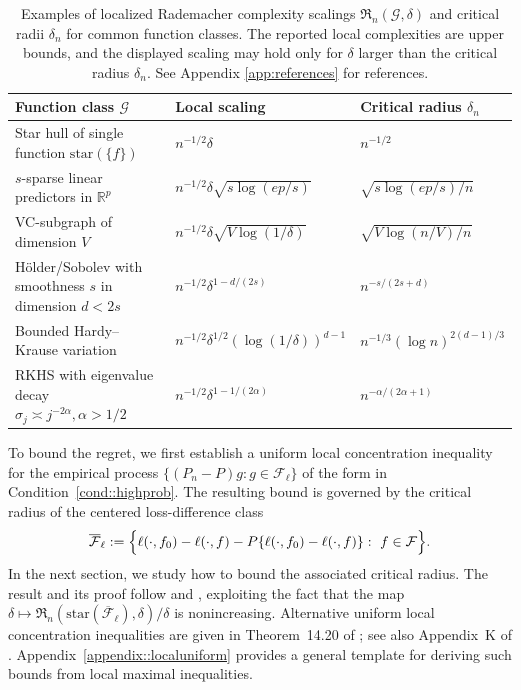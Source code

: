 \documentclass[11pt]{article}
\theoremstyle{plain}
\theoremstyle{definition} %
\begin{document}
\begin{table}[h]
\centering
\caption{Examples of localized Rademacher complexity scalings \(\mathfrak{R}_n(\mathcal{G},\delta)\) and critical radii \(\delta_n\) for common function classes. The reported local complexities are upper bounds, and the displayed scaling may hold only for \(\delta\) larger than the critical radius \(\delta_n\). See Appendix \ref{app:references} for references.}
\label{tab:critical_radii_examples}
\begin{tabular}{|lll|}
\hline
Function class $\mathcal{G}$ & Local scaling & Critical radius $\delta_n$ \\
\hline
Star hull of single function $\mathrm{star}(\{f\})$
& $n^{-1/2}\delta$
& $n^{-1/2}$ \\
$s$-sparse linear predictors in $\mathbb{R}^p$
& $n^{-1/2}\delta \sqrt{s\log(e p/s)}$
& $\sqrt{s\log(e p/s)/n}$
\\
VC-subgraph of dimension $V$
& $n^{-1/2}\delta \sqrt{V\log(1/\delta)}$
& $\sqrt{V\log(n/V)/n}$
\\
H\"older/Sobolev with smoothness $s$ in dimension $d < 2s$
& $n^{-1/2}\delta^{1-d/(2s)}$
& $n^{-s/(2s+d)}$
\\
Bounded Hardy--Krause variation
& $n^{-1/2}\delta^{1/2}(\log(1/\delta))^{d-1}$
& $n^{-1/3}(\log n)^{2(d-1)/3}$
\\
RKHS with eigenvalue decay $\sigma_j \asymp j^{-2\alpha}, \alpha > 1/2$
& $n^{-1/2}\delta^{1-1/(2\alpha)}$
& $n^{-\alpha/(2\alpha+1)}$
\\
\hline
\end{tabular}
\end{table}
 


To bound the regret, we first establish a uniform local concentration inequality for the empirical process \(\{(P_n-P)g : g\in\mathcal F_\ell\}\) of the form in Condition~\ref{cond::highprob}. The resulting bound is governed by the critical radius of the centered loss-difference class
\[
\overline{\mathcal{F}}_{\ell}
:=
\Bigl\{\ell(\cdot,f_0)-\ell(\cdot,f)-P\{\ell(\cdot,f_0)-\ell(\cdot,f)\}:\ f\in\mathcal F\Bigr\}.
\]
In the next section, we study how to bound the associated critical radius. The result and its proof follow \citet{bartlett2005local} and \citet{bartlett2006empirical}, exploiting the fact that the map  $\delta \mapsto \mathfrak{R}_n(\mathrm{star}(\overline{\mathcal{F}}_{\ell}),\delta) / \delta$
is nonincreasing. Alternative uniform local concentration inequalities are given in Theorem~14.20 of \citet{wainwright2019high}; see also Appendix~K of \citet{foster2023orthogonal}. Appendix~\ref{appendix::localuniform} provides a general template for deriving such bounds from local maximal inequalities.
\end{document}
